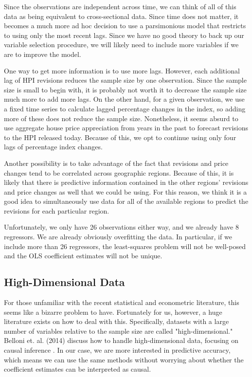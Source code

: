 \documentclass[AER]{AEA}
\begin{document}
Since the observations are independent across time, we can think of all of this data as being equivalent to cross-sectional data. Since time does not matter, it becomes a much more ad hoc decision to use a parsimonious model that restricts to using only the most recent lags. Since we have no good theory to back up our variable selection procedure, we will likely need to include more variables if we are to improve the model.

One way to get more information is to use more lags. However, each additional lag of HPI revisions reduces the sample size by one observation. Since the sample size is small to begin with, it is probably not worth it to decrease the sample size much more to add more lags. On the other hand, for a given observation, we use a fixed time series to calculate lagged percentage changes in the index, so adding more of these does not reduce the sample size. Nonetheless, it seems absurd to use aggregate house price appreciation from years in the past to forecast revisions to the HPI released today. Because of this, we opt to continue using only four lags of percentage index changes.

Another possibility is to take advantage of the fact that revisions and price changes tend to be correlated across geographic regions. Because of this, it is likely that there is predictive information contained in the other regions' revisions and price changes as well that we could be using. For this reason, we think it is a good idea to simultaneously use data for all of the available regions to predict the revisions for each particular region.

Unfortunately, we only have 26 observations either way, and we already have 8 regressors. We are already obviously overfitting the data. In particular, if we include more than 26 regressors, the least-squares problem will not be well-posed and the OLS coefficient estimates will not be unique.

\subsection{High-Dimensional Data}

For those unfamiliar with the recent statistical and econometric literature, this seems like a bizarre problem to have. Fortunately for us, however, a huge literature exists on how to deal with this. Specifically, datasets with a large number of variables relative to the sample size are called "high-dimensional." Belloni et. al. (2014) discuss how to handle high-dimensional data, focusing on causal inference \cite{JEPHighDim}. In our case, we are more interested in predictive accuracy, which means we can use the same methods without worrying about whether the coefficient estimates can be interpreted as  causal. 
\end{document}
